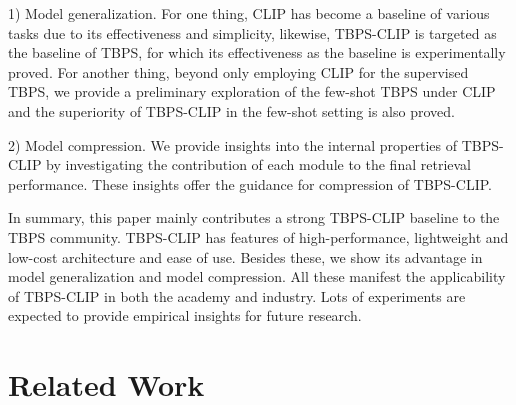 \documentclass[letterpaper]{article} %
\begin{document}
1) Model generalization.
For one thing, CLIP has become a baseline of various tasks due to its effectiveness and simplicity, likewise, TBPS-CLIP is targeted as the baseline of TBPS, for which its effectiveness as the baseline is experimentally proved. 
For another thing, beyond only employing CLIP for the supervised TBPS, we provide a preliminary exploration of the few-shot TBPS under CLIP and the superiority of TBPS-CLIP in the few-shot setting is also proved.

2) Model compression. 
We provide insights into the internal properties of TBPS-CLIP by investigating the contribution of each module to the final retrieval performance. These insights offer the guidance for compression of TBPS-CLIP.


In summary, this paper mainly contributes a strong TBPS-CLIP baseline to the TBPS community.
TBPS-CLIP has features of high-performance, lightweight and low-cost architecture and ease of use.
Besides these, we show its advantage in model generalization and model compression.
All these manifest the applicability of TBPS-CLIP in both the academy and industry.
Lots of experiments are expected to provide empirical insights for future research.





\section{Related Work}
\end{document}
